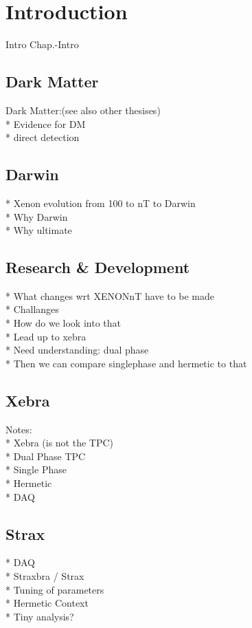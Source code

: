 \chapter{Introduction}
\label{chap:Intro}

Intro Chap.-Intro

\section{Dark Matter}
\label{sec:DarkMatter}

Dark Matter:(see also other thesises) \\
* Evidence for DM \\
* direct detection


\section{Darwin}
\label{sec:Darwin}

* Xenon evolution from 100 to nT to Darwin \\
* Why Darwin \\
* Why ultimate


\section{Research \& Development}
\label{sec:RnD}

* What changes wrt XENONnT have to be made \\
* Challanges \\
* How do we look into that \\
* Lead up to xebra \\
* Need understanding: dual phase \\
* Then we can compare singlephase and hermetic to that


\section{Xebra}
\label{sec:Xebra}

Notes: \\
* Xebra (is not the TPC) \\
* Dual Phase TPC \\
* Single Phase \\
* Hermetic \\
* DAQ

\section{Strax}
\label{sec:Strax}

* DAQ \\
* Straxbra / Strax \\
* Tuning of parameters \\
* Hermetic Context \\
* Tiny analysis?
